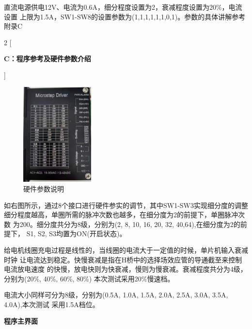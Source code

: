 \documentclass[UTF8,14pt]{article}
\newcommand\sectiontwo[1]{\centerline{\large{\bfseries{#1}}}}
\begin{document}
直流电源供电12V、电流为0.6A，细分程度设置为2，衰减程度设置为20\%，电流设置
上限为1.5A，SW1-SW8的设置参数为(1,1,1,1,1,1,0,1)。参数的具体讲解参考附录C
\clearpage
\setlength{\columnsep}{1cm}
\begin{multicols*}{2}
	[
		\sectiontwo{C：程序参考及硬件参数介绍}
	]
	

	\vspace{0.5cm}

	\begin{figure}
		\centering
		\vspace{-10pt}
		\includegraphics[width=3.7cm]{figures/硬件示意图.pdf}
		\vspace{-15pt}
		\caption{硬件参数说明}
		\vspace{-15pt}
	\end{figure}

	如右图所示，通过8个接口进行硬件参实的调节，其中SW1-SW3实现细分度的调整
	细分程度越高，单圈所需的脉冲次数也越多，在细分度为2的前提下，单圈脉冲次数
	为200。细分度共分为8级，分别为(2, 8, 10, 16, 20, 32, 40,64),在细分度为2的前提下，
	S1, S2, S3均置为ON(开启状态)。

	给电机线圈充电过程是线性的，当线圈的电流大于一定值的时候，单片机输入衰减时钟
	让电流达到稳定。快慢衰减是指在H桥中的选择场效应管的导通截至来控制电流放电速度
	的快慢，放电快则为快衰减，慢则为慢衰减。衰减程度共分为4级，分别为(20\%, 40\%, 60\%, 80\%)
	本次测试采用20\%慢速档。

	电流大小同样可分为8级，分别为(0.5A, 1.0A, 1.5A, 2.0A, 2.5A, 3.0A, 3.5A, 4.0A),本次测试
	采用1.5A档位。
\end{multicols*}
\clearpage
\sectiontwo{程序主界面}
\end{document}
